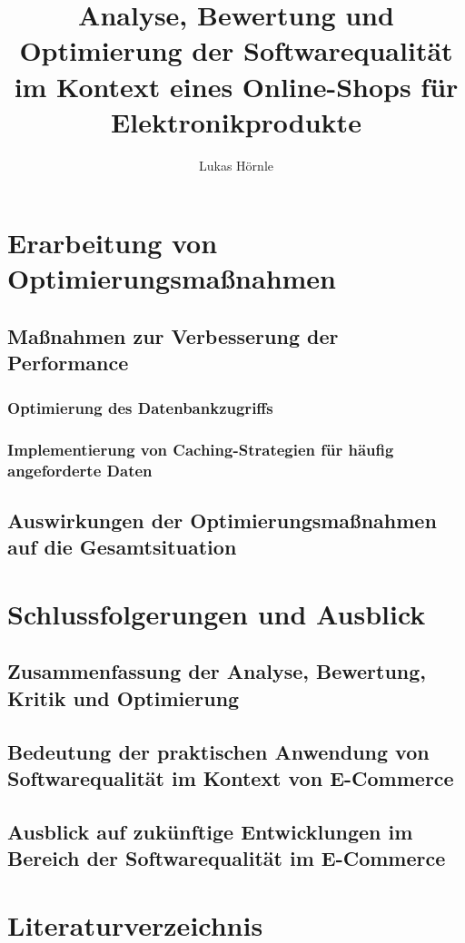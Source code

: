 \documentclass{article}
\begin{document}
\title{Analyse, Bewertung und Optimierung der Softwarequalität im Kontext eines Online-Shops für Elektronikprodukte}
\author{Lukas Hörnle}
\maketitle

\tableofcontents
\newpage


\newpage

\newpage

\newpage

\newpage

\newpage


\section{Erarbeitung von Optimierungsmaßnahmen}
\subsection{Maßnahmen zur Verbesserung der Performance}
\subsubsection{Optimierung des Datenbankzugriffs}
\subsubsection{Implementierung von Caching-Strategien für häufig angeforderte Daten}
\subsection{Auswirkungen der Optimierungsmaßnahmen auf die Gesamtsituation}

\section{Schlussfolgerungen und Ausblick}
\subsection{Zusammenfassung der Analyse, Bewertung, Kritik und Optimierung}
\subsection{Bedeutung der praktischen Anwendung von Softwarequalität im Kontext von E-Commerce}
\subsection{Ausblick auf zukünftige Entwicklungen im Bereich der Softwarequalität im E-Commerce}

\section{Literaturverzeichnis}
\printbibliography[title={quellen.tex}]
\end{document}
